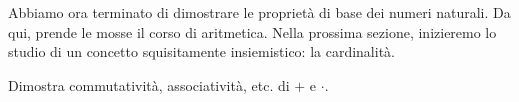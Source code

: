 Abbiamo ora terminato di dimostrare le proprietà di base dei numeri naturali. Da qui, prende le mosse il corso di aritmetica. Nella prossima sezione, inizieremo
lo studio di un concetto squisitamente insiemistico: la cardinalità.

\begin{exercise}
	Dimostra commutatività, associatività, etc. di $+$ e $\cdot$.
\end{exercise}